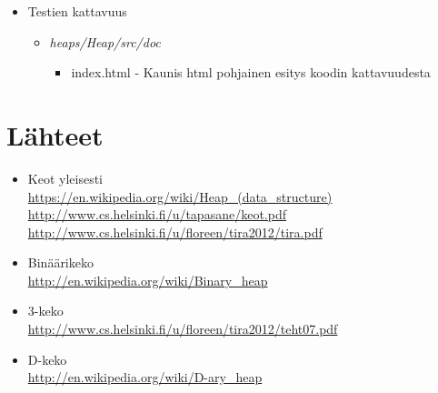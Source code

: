 \documentclass[a4paper,12pt]{article}
\begin{document}
\begin{itemize}
\item Testien kattavuus
\begin{itemize}
\item \emph{heaps/Heap/src/doc} 
\begin{itemize}
\item index.html - Kaunis html pohjainen esitys koodin kattavuudesta
\end{itemize}
\end{itemize}

\end{itemize}


\section{Lähteet}
\begin{itemize}

\item Keot yleisesti\\
\url{https://en.wikipedia.org/wiki/Heap_(data_structure)}\\
\url{http://www.cs.helsinki.fi/u/tapasane/keot.pdf}\\
\url{http://www.cs.helsinki.fi/u/floreen/tira2012/tira.pdf}

\item Binäärikeko\\
\url{http://en.wikipedia.org/wiki/Binary_heap}

\item 3-keko\\
\url{http://www.cs.helsinki.fi/u/floreen/tira2012/teht07.pdf}

\item D-keko\\
\url{http://en.wikipedia.org/wiki/D-ary_heap}
\end{itemize}
\end{document}
